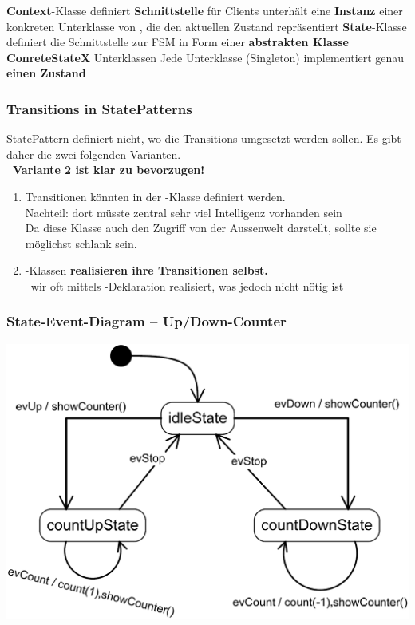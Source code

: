 \begin{outline}
    \1 \textbf{Context}-Klasse
        \2 definiert \textbf{Schnittstelle} für Clients
        \2 unterhält eine \textbf{Instanz} einer konkreten Unterklasse von , die den aktuellen Zustand repräsentiert
    \1 \textbf{State}-Klasse
        \2 definiert die Schnittstelle zur FSM in Form einer \textbf{abstrakten Klasse}
    \1 \textbf{ConreteStateX} Unterklassen
        \2 Jede Unterklasse (Singleton) implementiert genau \textbf{einen Zustand}
\end{outline}


\subsubsection{Transitions in StatePatterns}

StatePattern definiert nicht, wo die Transitions umgesetzt werden sollen. Es gibt daher die zwei folgenden Varianten. \\
\textbf{ \textrightarrow\ Variante 2 ist klar zu bevorzugen!}

\vspace{0.2cm}

\begin{enumerate}
    \item Transitionen könnten in der -Klasse definiert werden. \\
        Nachteil: dort müsste zentral sehr viel Intelligenz vorhanden sein \\
        Da diese Klasse auch den Zugriff von der Aussenwelt darstellt, sollte sie möglichst schlank sein.
    \item {}-Klassen \textbf{realisieren ihre Transitionen selbst.} \\
        \textrightarrow\ wir oft mittels -Deklaration realisiert, was jedoch nicht nötig ist
\end{enumerate}


\subsubsection{State-Event-Diagram -- Up/Down-Counter}
\label{State-Event-Diagram -- Up/Down-Counter - StatePattern}

\begin{center}
    \includegraphics[width=0.7\columnwidth]{images/fsm_up-down-counter_diagramm_state_pattern.png}
\end{center}


